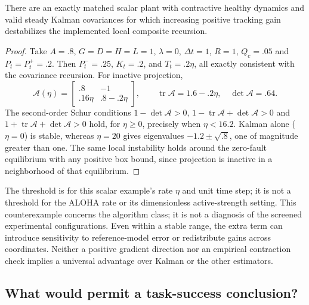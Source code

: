 \begin{proposition}
\label{prop:tracking-limit}
There are an exactly matched scalar plant with contractive healthy dynamics and
valid steady Kalman covariances for which increasing positive tracking gain
destabilizes the implemented local composite recursion.
\end{proposition}
\begin{proof}
Take $A=.8$, $G=D=H=L=1$, $\lambda=0$, $\Delta t=1$, $R=1$, $Q_c=.05$ and
$P_t=P_t^+=.2$. Then $P_t^-=.25$, $K_t=.2$, and $T_t=.2\eta$, all exactly
consistent with the covariance recursion. For inactive projection,
\begin{equation}
\mathcal A(\eta)=
\begin{bmatrix}.8&-1\\.16\eta&.8-.2\eta\end{bmatrix},\qquad
\operatorname{tr}\mathcal A=1.6-.2\eta,\quad
\det\mathcal A=.64.
\end{equation}
The second-order Schur conditions
$1-\det\mathcal A>0$, $1-\operatorname{tr}\mathcal A+\det\mathcal A>0$ and
$1+\operatorname{tr}\mathcal A+\det\mathcal A>0$ hold, for $\eta\ge0$, precisely
when $\eta<16.2$. Kalman alone ($\eta=0$) is stable, whereas $\eta=20$ gives
eigenvalues $-1.2\pm\sqrt{.8}$, one of magnitude greater than one. The same
local instability holds around the zero-fault equilibrium with any positive
box bound, since projection is inactive in a neighborhood of that equilibrium.
\end{proof}

The threshold is for this scalar example's rate $\eta$ and unit time step; it
is not a threshold for the ALOHA rate or its dimensionless active-strength setting.
This counterexample concerns the algorithm class; it is not a diagnosis of the
screened experimental configurations. Even within a stable range, the extra
term can introduce sensitivity to reference-model error or redistribute gains
across coordinates. Neither a positive gradient direction nor an empirical
contraction check implies a universal advantage over Kalman or the other
estimators.

\subsection{What would permit a task-success conclusion?}

